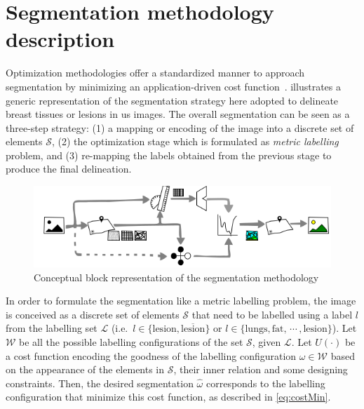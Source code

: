 \graphicspath{ {./content/method/figures/} {./content/intro/figures/} }

\section{Segmentation methodology description} 

Optimization methodologies offer a standardized manner to approach segmentation by minimizing an application-driven cost function~\cite{cremers2007review}.
 illustrates a generic representation of the segmentation strategy here adopted to delineate breast tissues or lesions in \ac{us} images. 
The overall segmentation can be seen as a three-step strategy: 
(1) a mapping or encoding of the image into a discrete set of elements $\mathcal{S}$, 
(2) the optimization stage which is formulated as \emph{metric labelling} problem, 
and (3) re-mapping the labels obtained from the previous stage to produce the final delineation. 

\begin{figure}[htpb]
  \centering
  \includegraphics[width=0.9\linewidth]{method}
  \caption{Conceptual block representation of the segmentation methodology}
  \label{fig:method}
\end{figure}

In order to formulate the segmentation like a metric labelling problem, the image is conceived as a discrete set of elements $\mathcal{S}$ that need to be labelled using a label $l$ from the labelling set $\mathcal{L}$ 
(i.e.\, $l \in \{\text{lesion}, \overline{\text{lesion}}\}$ 
or $l \in \{\text{lungs}, \text{fat},\,\cdots\,, \text{lesion}\}$).
Let $\mathcal{W}$ be all the possible labelling configurations of the set $\mathcal{S}$, given $\mathcal{L}$.
Let $U(\cdot)$ be a cost function encoding the goodness of the labelling configuration $\omega \in \mathcal{W}$ based on the appearance of the elements in $\mathcal{S}$, their inner relation and some designing constraints.
Then, the desired segmentation $\hat{\omega}$ corresponds to the labelling configuration that minimize this cost function, as described in \cref{eq:costMin}.

